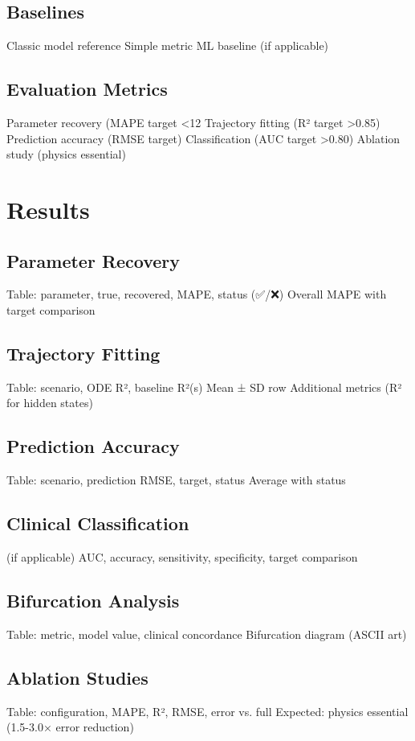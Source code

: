\documentclass[12pt]{article}
\begin{document}
  \subsection{Baselines}
    Classic model reference
    Simple metric
    ML baseline (if applicable)

  \subsection{Evaluation Metrics}
    Parameter recovery (MAPE target <12%
    Trajectory fitting (R² target >0.85)
    Prediction accuracy (RMSE target)
    Classification (AUC target >0.80)
    Ablation study (physics essential)

\section{Results}
  \subsection{Parameter Recovery}
    Table: parameter, true, recovered, MAPE, status (✅/❌)
    Overall MAPE with target comparison

  \subsection{Trajectory Fitting}
    Table: scenario, ODE R², baseline R²(s)
    Mean ± SD row
    Additional metrics (R² for hidden states)

  \subsection{Prediction Accuracy}
    Table: scenario, prediction RMSE, target, status
    Average with status

  \subsection{Clinical Classification} (if applicable)
    AUC, accuracy, sensitivity, specificity, target comparison

  \subsection{Bifurcation Analysis}
    Table: metric, model value, clinical concordance
    Bifurcation diagram (ASCII art)

  \subsection{Ablation Studies}
    Table: configuration, MAPE, R², RMSE, error vs. full
    Expected: physics essential (1.5-3.0× error reduction)
\end{document}
